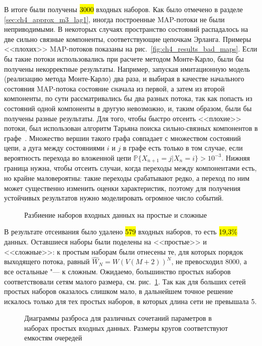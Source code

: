 В итоге были получены \hl{3000} входных наборов. Как было отмечено в разделе \ref{sec:ch4_approx_m3_lag1}, иногда построенные MAP-потоки не были неприводимыми. В некоторых случаях пространство состояний распадалось на две сильно связные компоненты, соответствующие цепочкам Эрланга. Примеры <<плохих>> MAP-потоков показаны на рис.~\ref{fig:ch4_results_bad_maps}. Если бы такие потоки использовались при расчете методом Монте-Карло, были бы получены некорректные результаты. Например, запуская имитационную модель (реализацию метода Монте-Карло) два раза, и выбирая в качестве начального состояния MAP-потока состояние сначала из первой, а затем из второй компоненты, по сути рассматривались бы два разных потока, так как попасть из состояний одной компоненты в другую невозможно, и, таким образом, были бы получены разные результаты. Для того, чтобы быстро отсеить <<плохие>> потоки, был использован алгоритм Тарьяна поиска сильно-связных компонентов в графе~\cite{tarjan72}. Множество вершин такого графа совпадает с множеством состояний цепи, а дуга между состояниями $i$ и $j$ в графе есть только в том случае, если вероятность перехода во вложенной цепи $\mathbb{P}\{X_{n+1} = j | X_n = i\} > 10^{-3}$. Нижняя граница нужна, чтобы отсеить случаи, когда переходы между компонентами есть, но крайне маловероятны: такие переходы срабатывают редко, а переход по ним может существенно изменить оценки характеристик, поэтому для получения устойчивых результатов нужно моделировать огромное число событий.

\begin{figure}[h]
  \caption{Разбиение наборов входных данных на простые и сложные}\label{fig:ch4_complexity_split}
\end{figure}

В результате отсеивания было удалено \hl{579} входных наборов, то есть \hl{19,3\%} данных. Оставшиеся наборы были поделены на <<простые>> и <<сложные>>: к простым наборам были отнесены те, для которых порядок выходящего потока, равный $\hat{W}_N = W(V(M+2))^N$, не превосходил 8000, а все остальные "--- к сложным. Ожидаемо, большинство простых наборов соответствовали сетям малого размера, см. рис.~\ref{fig:ch4_complexity_split}. Так как для больших сетей простых наборов оказалось слишком мало, в дальнейшем точное решение искалось только для тех простых наборов, в которых длина сети не превышала 5.

\begin{figure}[h]
  \caption{Диаграммы разброса для различных сочетаний параметров в наборах простых входных данных. Размеры кругов соответствуют емкостям очередей}\label{fig:ch4_input_scatter}
\end{figure}

